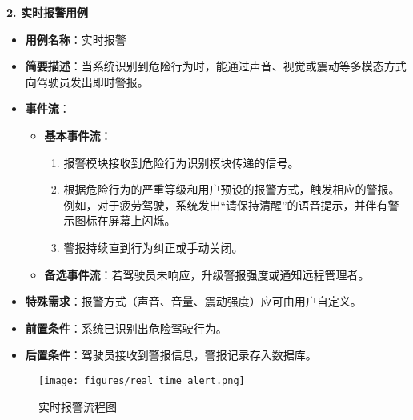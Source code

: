 \documentclass[a4paper,12pt]{article}
\begin{document}
\textbf{2. 实时报警用例}
\begin{itemize}
    \item \textbf{用例名称}：实时报警
    \item \textbf{简要描述}：当系统识别到危险行为时，能通过声音、视觉或震动等多模态方式向驾驶员发出即时警报。
    \item \textbf{事件流}：
    \begin{itemize}
        \item \textbf{基本事件流}：
        \begin{enumerate}
            \item 报警模块接收到危险行为识别模块传递的信号。
            \item 根据危险行为的严重等级和用户预设的报警方式，触发相应的警报。例如，对于疲劳驾驶，系统发出“请保持清醒”的语音提示，并伴有警示图标在屏幕上闪烁。
            \item 警报持续直到行为纠正或手动关闭。
        \end{enumerate}
        \item \textbf{备选事件流}：若驾驶员未响应，升级警报强度或通知远程管理者。
    \end{itemize}
    \item \textbf{特殊需求}：报警方式（声音、音量、震动强度）应可由用户自定义。
    \item \textbf{前置条件}：系统已识别出危险驾驶行为。
    \item \textbf{后置条件}：驾驶员接收到警报信息，警报记录存入数据库。
\end{itemize}

\begin{figure}[htbp]
    \centering
    \texttt{[image: figures/real\_time\_alert.png]}
    \caption{实时报警流程图}
    \label{fig:real_time_alert}
\end{figure}
\end{document}
